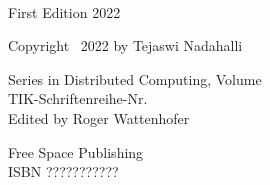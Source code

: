 ~\\
\vfill

\noindent
First Edition 2022\\
\vspace{0.1cm}

\noindent
Copyright \textcopyright~2022 by Tejaswi Nadahalli\\  %
\vspace{0.1cm}

\noindent
Series in Distributed Computing, Volume \DISCOSERIESNUMBER \\
TIK-Schriftenreihe-Nr.\ \TIKSERIESNUMBER \\
Edited by Roger Wattenhofer\\
\vspace{0.1cm}

\noindent
Free Space Publishing\\  %
ISBN ???????????\\  %
